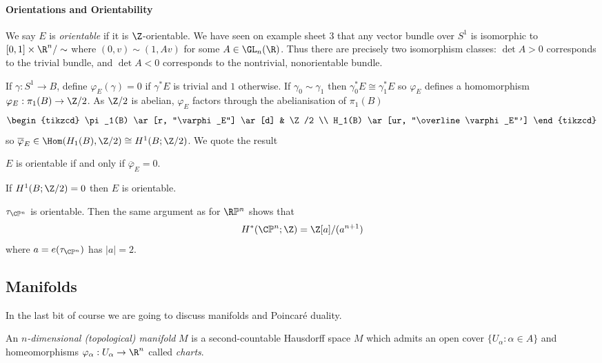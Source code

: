 \documentclass[a4paper]{article}
\renewcommand*{\P}{\mathbb{P}}
\begin{document}
\paragraph{Orientations and Orientability}

We say \(E\) is \emph{orientable} if it is \(\Z\)-orientable. We have seen on example sheet 3 that any vector bundle over \(S^1\) is isomorphic to \([0, 1] \times \R^n/\sim\) where \((0, v) \sim (1, A v)\) for some \(A \in \GL_n(\R)\). Thus there are precisely two isomorphism classes: \(\det A > 0\) corresponds to the trivial bundle, and \(\det A < 0\) corresponds to the nontrivial, nonorientable bundle.

If \(\gamma: S^1 \to B\), define \(\varphi_E(\gamma) = 0\) if \(\gamma^*E\) is trivial and \(1\) otherwise. If \(\gamma_0 \sim \gamma_1\) then \(\gamma_0^* E \cong \gamma_1^* E\) so \(\varphi_E\) defines a homomorphism \(\varphi_E: \pi_1(B) \to \Z/2\). As \(\Z/2\) is abelian, \(\varphi_E\) factors through the abelianisation of \(\pi_1(B)\)
\[
  \begin{tikzcd}
    \pi_1(B) \ar[r, "\varphi_E"] \ar[d] & \Z/2 \\
    H_1(B) \ar[ur, "\overline \varphi_E"']
  \end{tikzcd}
\]
so \(\overline \varphi_E \in \Hom(H_1(B), \Z/2) \cong H^1(B; \Z/2)\). We quote the result

\begin{theorem}
  \(E\) is orientable if and only if \(\overline \varphi_E = 0\).
\end{theorem}

\begin{corollary}
  If \(H^1(B; \Z/2) = 0\) then \(E\) is orientable.
\end{corollary}

\begin{eg}
  \(\tau_{\C\P^n}\) is orientable. Then the same argument as for \(\R\P^n\) shows that
  \[
    H^*(\C\P^n; \Z) = \Z[a]/(a^{n + 1})
  \]
  where \(a = e(\tau_{\C\P^n})\) has \(|a| = 2\).
\end{eg}

\subsection{Manifolds}

In the last bit of course we are going to discuss manifolds and Poincaré duality.

\begin{definition}
  An \emph{\(n\)-dimensional (topological) manifold} \(M\) is a second-countable Hausdorff space \(M\) which admits an open cover \(\{U_\alpha: \alpha \in A\}\) and homeomorphisms \(\varphi_\alpha: U_\alpha \to \R^n\) called \emph{charts}.
\end{definition}
\end{document}
